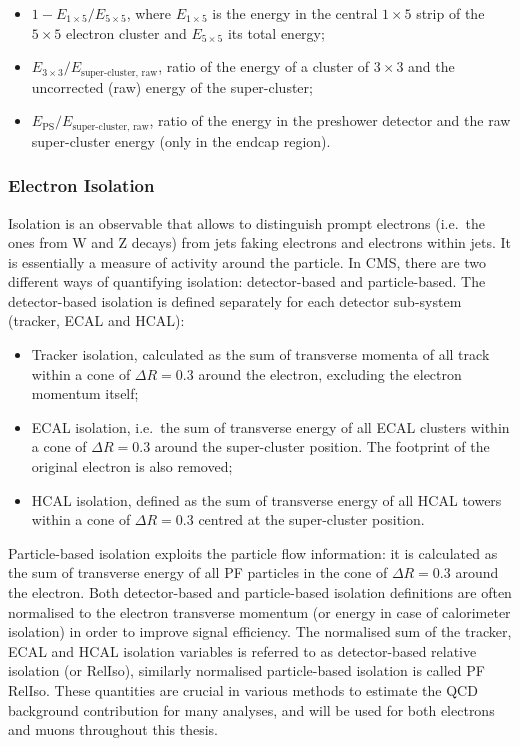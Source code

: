 \begin{itemize}
  \item $1-E_{1\times 5}/E_{5\times 5}$, where $E_{1\times 5}$ is the energy in the central $1\times 5$ strip of the
  $5\times 5$ electron cluster and $E_{5\times 5}$ its total energy;
  \item $E_{3\times 3}/E_\text{super-cluster, raw}$, ratio of the energy of a cluster of $3\times 3$ and the
  uncorrected (raw) energy of the super-cluster;
  \item $E_\text{PS}/E_\text{super-cluster, raw}$, ratio of the energy in the preshower detector and the raw
  super-cluster energy (only in the endcap region).
\end{itemize}

\subsubsection{Electron Isolation}
\label{sss:electron_isolation}

Isolation is an observable that allows to distinguish prompt electrons (i.e.\ the ones from W and Z decays) from jets
faking electrons and electrons within jets. It is essentially a measure of activity around the particle. In CMS, there
are two different ways of quantifying isolation: detector-based and particle-based. The detector-based isolation is
defined separately for each detector sub-system (tracker, ECAL and HCAL):

\begin{itemize}
  \item Tracker isolation, calculated as the sum of transverse momenta of all track within a cone of $\Delta R = 0.3$
  around the electron, excluding the electron momentum itself;
  \item ECAL isolation, i.e.\ the sum of transverse energy of all ECAL clusters within a cone of $\Delta R = 0.3$
  around the super-cluster position. The footprint of the original electron is also removed;
  \item HCAL isolation, defined as the sum of transverse energy of all HCAL towers within a cone of $\Delta R = 0.3$
  centred at the super-cluster position.
\end{itemize}

Particle-based isolation exploits the particle flow information: it is calculated as the sum of transverse energy of all
PF particles in the cone of $\Delta R = 0.3$ around the electron. Both detector-based and particle-based isolation
definitions are often normalised to the electron transverse momentum (or energy in case of calorimeter isolation) in
order to improve signal efficiency. The normalised sum of the tracker, ECAL and HCAL isolation variables is referred to
as detector-based relative isolation (or RelIso), similarly normalised particle-based isolation is called PF RelIso.
These quantities are crucial in various methods to estimate the QCD background contribution for many analyses, and will
be used for both electrons and muons throughout this thesis.

